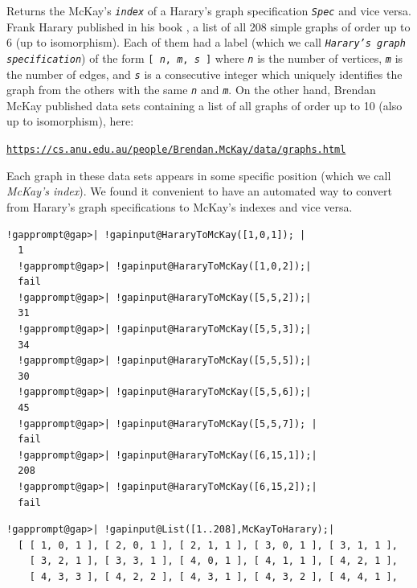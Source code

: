 \documentclass[a4paper,11pt]{report}
\begin{document}
{{{Returns the McKay's \mbox{\texttt{\mdseries\slshape index}} of a Harary's graph specification \mbox{\texttt{\mdseries\slshape Spec}} and vice versa. Frank Harary published in his book \cite{Har69}, a list of all 208 simple graphs of order up to 6 (up to isomorphism). Each
of them had a label (which we call \mbox{\texttt{\mdseries\slshape Harary's graph specification}}) of the form \texttt{[ \mbox{\texttt{\mdseries\slshape n}}, \mbox{\texttt{\mdseries\slshape m}}, \mbox{\texttt{\mdseries\slshape s}} ]} where \mbox{\texttt{\mdseries\slshape n}} is the number of vertices, \mbox{\texttt{\mdseries\slshape m}} is the number of edges, and \mbox{\texttt{\mdseries\slshape s}} is a consecutive integer which uniquely identifies the graph from the others
with the same \mbox{\texttt{\mdseries\slshape n}} and \mbox{\texttt{\mdseries\slshape m}}. On the other hand, Brendan McKay published data sets containing a list of
all graphs of order up to 10 (also up to isomorphism), here: 

\href{https://cs.anu.edu.au/people/Brendan.McKay/data/graphs.html} {\texttt{https://cs.anu.edu.au/people/Brendan.McKay/data/graphs.html}} 

Each graph in these data sets appears in some specific position (which we call \emph{McKay's index}). We found it convenient to have an automated way to convert from Harary's
graph specifications to McKay's indexes and vice versa. 


\begin{Verbatim}[commandchars=!@|,fontsize=\small,frame=single,label=Example]
  !gapprompt@gap>| !gapinput@HararyToMcKay([1,0,1]); |
  1
  !gapprompt@gap>| !gapinput@HararyToMcKay([1,0,2]);|
  fail
  !gapprompt@gap>| !gapinput@HararyToMcKay([5,5,2]);|
  31
  !gapprompt@gap>| !gapinput@HararyToMcKay([5,5,3]);|
  34
  !gapprompt@gap>| !gapinput@HararyToMcKay([5,5,5]);|
  30
  !gapprompt@gap>| !gapinput@HararyToMcKay([5,5,6]);|
  45
  !gapprompt@gap>| !gapinput@HararyToMcKay([5,5,7]); |
  fail
  !gapprompt@gap>| !gapinput@HararyToMcKay([6,15,1]);|
  208
  !gapprompt@gap>| !gapinput@HararyToMcKay([6,15,2]);|
  fail
\end{Verbatim}
 


\begin{Verbatim}[commandchars=!@|,fontsize=\small,frame=single,label=Example]
  !gapprompt@gap>| !gapinput@List([1..208],McKayToHarary);|
  [ [ 1, 0, 1 ], [ 2, 0, 1 ], [ 2, 1, 1 ], [ 3, 0, 1 ], [ 3, 1, 1 ], 
    [ 3, 2, 1 ], [ 3, 3, 1 ], [ 4, 0, 1 ], [ 4, 1, 1 ], [ 4, 2, 1 ], 
    [ 4, 3, 3 ], [ 4, 2, 2 ], [ 4, 3, 1 ], [ 4, 3, 2 ], [ 4, 4, 1 ], 
  

\end{Verbatim}}}}
\end{document}
